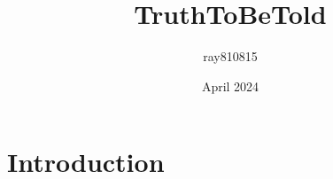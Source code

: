 \documentclass{article}
\title{TruthToBeTold}
\author{ray810815 }
\date{April 2024}
\begin{document}
\maketitle

\section{Introduction}
\end{document}
